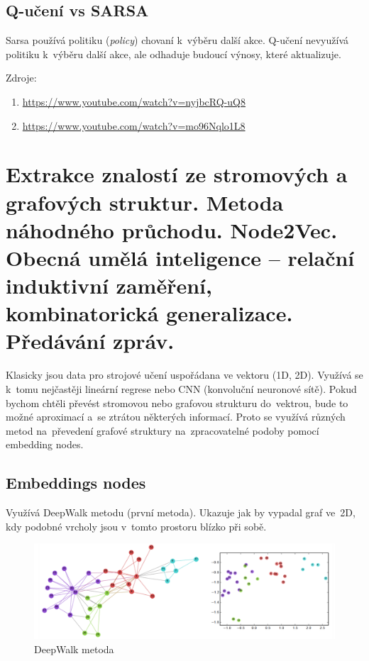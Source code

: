 \subsection{Q-učení vs SARSA}

Sarsa používá politiku (\emph{policy}) chovaní k~výběru další akce.
Q-učení nevyužívá politiku k~výběru další akce, ale odhaduje budoucí výnosy, které aktualizuje.

Zdroje:
\begin{enumerate}
    \item \url{https://www.youtube.com/watch?v=nyjbcRQ-uQ8}
    \item \url{https://www.youtube.com/watch?v=mo96Nqlo1L8}
\end{enumerate}

\clearpage
\section{Extrakce znalostí ze stromových a grafových struktur. Metoda náhodného průchodu. Node2Vec. Obecná umělá inteligence – relační induktivní zaměření, kombinatorická generalizace. Předávání zpráv.}

Klasicky jsou data pro strojové učení uspořádana ve vektoru (1D, 2D). 
Využívá se k~tomu nejčastěji lineární regrese nebo CNN (konvoluční neuronové sítě). 
Pokud bychom chtěli převést stromovou nebo grafovou strukturu do~vektrou, bude to možné aproximací a~se ztrátou některých informací.
Proto se využívá různých metod na~převedení grafové struktury na~zpracovatelné podoby pomocí embedding nodes.

\subsection{Embeddings nodes}

Využívá DeepWalk metodu (první metoda). 
Ukazuje jak by vypadal graf ve~2D, kdy podobné vrcholy jsou v~tomto prostoru blízko při sobě.

\begin{figure}[ht]
    \centering
    \includegraphics[width=\textwidth]{images/11_deepwalk-graf}
    \caption{DeepWalk metoda}
\end{figure}

